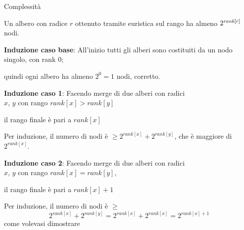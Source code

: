 \begin{frame}{Complessità}

\vspace{-9pt}
\begin{myboxtitle}[Teorema]
Un albero \mfset con radice $r$ ottenuto tramite euristica sul rango ha almeno
$2^{\textit{rank}[r]}$ nodi.
\end{myboxtitle}

\begin{myboxtitle}
\begin{overprint}
\BIL
\item \textbf{Induzione caso base}: All'inizio tutti gli alberi sono costituiti da un nodo singolo, con rank 0;
\item quindi ogni albero ha almeno $2^0=1$ nodi, corretto.
\EIL
{}
\BIL
\item \textbf{Induzione caso 1}:
Facendo merge di due alberi con radici\\ $x$, $y$ con rango 
$\mathit{rank}[x] > \mathit{rank}[y]$

\smallskip
\BIL
\item il rango finale è pari a $\mathit{rank}[x]$
\item Per induzione, il numero di nodi è ${} \geq 2^{\mathit{rank}[x]} + 2^{\mathit{rank}[y]}$, 
che è maggiore di $2^{\mathit{rank}[x]}$.
\EIL
\EIL
{}
\BIL
\item \textbf{Induzione caso 2}: Facendo merge di due alberi con radici\\ $x$, $y$ con rango $\mathit{rank}[x] = \mathit{rank}[y]$, 

\smallskip
\BIL
\item il rango finale è pari a $\mathit{rank}[x]+1$ 
\item Per induzione, il numero di nodi è $\geq$ 
\[
  2^{\mathit{rank}[x]}+2^{\mathit{rank}[y]} = 2^{\mathit{rank}[x]} + 2^{\mathit{rank}[x]} = 2^{\mathit{rank}[x]+1}
\]
\EIL
come volevasi dimostrare

\EIL
\end{overprint}
\end{myboxtitle}



\end{frame}

